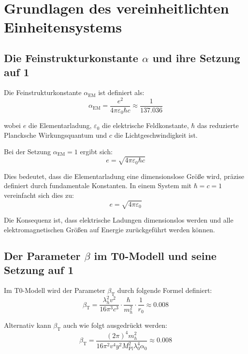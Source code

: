 \documentclass[12pt,a4paper]{article}
\newcommand{\alphaEM}{\alpha_{\text{EM}}}
\newcommand{\betaT}{\beta_{\text{T}}}
\newcommand{\Mpl}{M_{\text{Pl}}}
\begin{document}
	\section{Grundlagen des vereinheitlichten Einheitensystems}
	
	\subsection{Die Feinstrukturkonstante $\alpha$ und ihre Setzung auf 1}
	
	Die Feinstrukturkonstante $\alphaEM$ ist definiert als:
	\begin{equation}
		\alphaEM = \frac{e^2}{4\pi\varepsilon_0 \hbar c} \approx \frac{1}{137.036}
	\end{equation}
	
	wobei $e$ die Elementarladung, $\varepsilon_0$ die elektrische Feldkonstante, $\hbar$ das reduzierte Plancksche Wirkungsquantum und $c$ die Lichtgeschwindigkeit ist.
	
	Bei der Setzung $\alphaEM = 1$ ergibt sich:
	\begin{equation}
		e = \sqrt{4\pi\varepsilon_0 \hbar c}
	\end{equation}
	
	Dies bedeutet, dass die Elementarladung eine dimensionslose Größe wird, präzise definiert durch fundamentale Konstanten. In einem System mit $\hbar = c = 1$ vereinfacht sich dies zu:
	\begin{equation}
		e = \sqrt{4\pi\varepsilon_0}
	\end{equation}
	
	Die Konsequenz ist, dass elektrische Ladungen dimensionslos werden und alle elektromagnetischen Größen auf Energie zurückgeführt werden können.
	
	\subsection{Der Parameter $\beta$ im T0-Modell und seine Setzung auf 1}
	
	Im T0-Modell wird der Parameter $\betaT$ durch folgende Formel definiert:
	\begin{equation}
		\betaT = \frac{\lambda_h^2 v^2}{16\pi^3 c^3} \cdot \frac{\hbar}{m_h^2} \cdot \frac{1}{r_0} \approx 0.008
	\end{equation}
	
	Alternativ kann $\betaT$ auch wie folgt ausgedrückt werden:
	\begin{equation}
		\betaT = \frac{(2\pi)^4 m_h^2}{16 \pi^2 v^4 y^2 \Mpl^2 \lambda_0^4 \alpha_0} \approx 0.008
	\end{equation}
	
\end{document}
